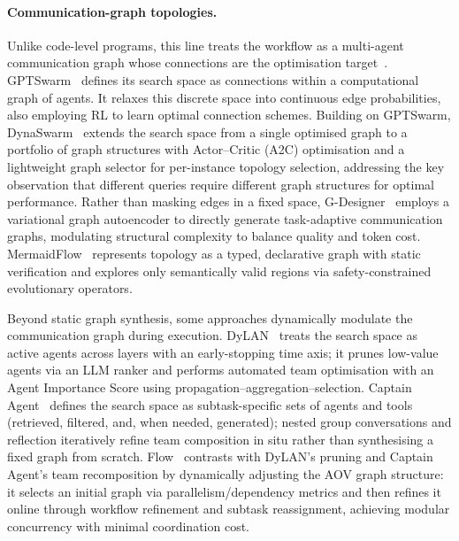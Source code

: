 \documentclass[]{selfevolagent}
\theoremstyle{plain}
\theoremstyle{definition}
\theoremstyle{remark}
\begin{document}
\paragraph{{Communication-graph topologies.}}
Unlike code\mbox{-}level programs, this line treats the workflow as a multi-agent communication graph whose connections are the optimisation target~\citep{liu2025graphaugmentedlargelanguagemodel}. 
GPTSwarm~\citep{zhuge2024gptswarm} defines its search space as connections within a computational graph of agents. It relaxes this discrete space into continuous edge probabilities, also employing RL to learn optimal connection schemes.
Building on GPTSwarm, DynaSwarm~\citep{leong2025dynaswarmdynamicallygraphstructure} extends the search space from a single optimised graph to a portfolio of graph structures with Actor–Critic (A2C) optimisation and a lightweight graph selector for per-instance topology selection, addressing the key observation that different queries require different graph structures for optimal performance.
Rather than masking edges in a fixed space, G\mbox{-}Designer~\citep{zhang2025gdesignerarchitectingmultiagentcommunication} employs a variational graph autoencoder to directly generate task-adaptive communication graphs, modulating structural complexity to balance quality and token cost. 
MermaidFlow~\citep{zheng2025mermaidflowredefiningagenticworkflow} represents topology as a typed, declarative graph with static verification and explores only semantically valid regions via safety-constrained evolutionary operators.
 
Beyond static graph synthesis, some approaches dynamically modulate the communication graph during execution.
DyLAN~\citep{liu2023dynamic} treats the search space as active agents across layers with an early-stopping time axis; it prunes low-value agents via an LLM ranker and performs automated team optimisation with an Agent Importance Score using propagation–aggregation–selection.
Captain Agent~\citep{song2025adaptiveinconversationteambuilding} defines the search space as subtask-specific sets of agents and tools (retrieved, filtered, and, when needed, generated); nested group conversations and reflection iteratively refine team composition in situ rather than synthesising a fixed graph from scratch.
Flow~\citep{niu2025flow} contrasts with DyLAN's pruning and Captain Agent's team recomposition by dynamically adjusting the AOV graph structure: it selects an initial graph via parallelism/dependency metrics and then refines it online through workflow refinement and subtask reassignment, achieving modular concurrency with minimal coordination cost.
\end{document}
